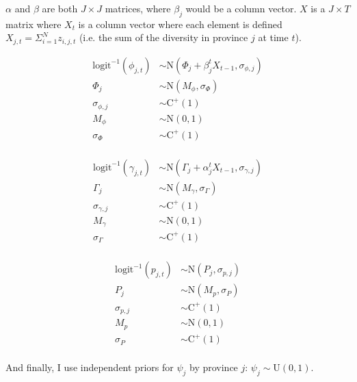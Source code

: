 \documentclass[12pt,letterpaper]{article}
\begin{document}
\(\alpha\) and \(\beta\) are both \(J \times J\) matrices, where \(\beta_{j}\) would be a column vector. \(X\) is a \(J \times T\) matrix where \(X_{t}\) is a column vector where each element is defined \(X_{j, t} = \Sigma_{i = 1}^{N} z_{i, j, t}\) (i.e. the sum of the diversity in province \(j\) at time \(t\)).


\begin{equation}
  \begin{aligned}
    \mathrm{logit}^{-1}(\phi_{j, t}) &\sim \mathrm{N}(\Phi_{j} + \beta_{j}^{t}X_{t - 1}, \sigma_{\phi, j}) \\
    \Phi_{j} &\sim \mathrm{N}(M_{\phi}, \sigma_{\Phi}) \\
    \sigma_{\phi, j} &\sim \mathrm{C}^{+}(1) \\
    M_{\phi} &\sim \mathrm{N}(0, 1) \\
    \sigma_{\Phi} &\sim \mathrm{C}^{+}(1) \\
  \end{aligned}
\end{equation}

\begin{equation}
  \begin{aligned}
    \mathrm{logit}^{-1}(\gamma_{j, t}) &\sim \mathrm{N}(\Gamma_{j} + \alpha_{j}^{t}X_{t - 1}, \sigma_{\gamma, j}) \\
    \Gamma_{j} &\sim \mathrm{N}(M_{\gamma}, \sigma_{\Gamma}) \\
    \sigma_{\gamma, j} &\sim \mathrm{C}^{+}(1) \\
    M_{\gamma} &\sim \mathrm{N}(0, 1) \\
    \sigma_{\Gamma} &\sim \mathrm{C}^{+}(1) \\
  \end{aligned}
\end{equation}

\begin{equation}
  \begin{aligned}
    \mathrm{logit}^{-1}(p_{j, t}) &\sim \mathrm{N}(P_{j}, \sigma_{p, j}) \\
    P_{j} &\sim \mathrm{N}(M_{p}, \sigma_{P}) \\
    \sigma_{p, j} &\sim \mathrm{C}^{+}(1) \\
    M_{p} &\sim \mathrm{N}(0, 1) \\
    \sigma_{P} &\sim \mathrm{C}^{+}(1) \\
  \end{aligned}
\end{equation}

And finally, I use independent priors for \(\psi_{j}\) by province \(j\): \(\psi_{j} \sim \mathrm{U}(0, 1)\).
\end{document}
